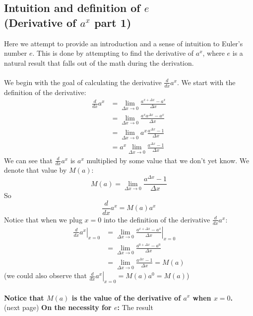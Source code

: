 \documentclass{report}
\begin{document}
\subsection{Intuition and definition of $e$\\(Derivative of $a^x$ part 1)} %
\label{introduction:differentiation:$e$}
Here we attempt to provide an introduction and a sense of intuition to Euler's number $e$. 
This is done by attempting to find the derivative of $a^x$, where $e$ is a natural result
that falls out of the math during the derivation.\\
\vspace{1mm}\\
We begin with the goal of calculating the derivative $\frac{d}{dx}a^x$. We start with the
definition of the derivative:
\begin{align*}
\frac{d}{dx}a^x&=\lim_{\Delta x\to0}\frac{a^{x+\Delta x}-a^x}{\Delta x}\\
&=\lim_{\Delta x\to0}\frac{a^xa^{\Delta x}-a^x}{\Delta x}\\
&=\lim_{\Delta x\to0}a^x\frac{a^{\Delta x}-1}{\Delta x}\\
&=a^x\lim_{\Delta x\to0}\frac{a^{\Delta x}-1}{\Delta x}
\end{align*}
We can see that $\frac{d}{dx}a^x$ is $a^x$ multiplied by some value that we don't yet know. 
We denote that value by $M(a)$:
\begin{equation*}
M(a)=\lim_{\Delta x\to0}\frac{a^{\Delta x}-1}{\Delta x}
\end{equation*}
So
\begin{equation*}
\frac{d}{dx}a^x=M(a)a^x
\end{equation*}
Notice that when we plug $x=0$ into the definition of the derivative $\frac{d}{dx}a^x$:
\begin{align*}
\left.\frac{d}{dx}a^x\right|_{x=0}&=
\lim_{\Delta x\to0}\left.\frac{a^{x+\Delta x}-a^x}{\Delta x}\right|_{x=0}\\
&=\lim_{\Delta x\to0}\frac{a^{0+\Delta x}-a^0}{\Delta x}\\
&=\lim_{\Delta x\to0}\frac{a^{\Delta x}-1}{\Delta x}=M(a)
\end{align*}
(we could also observe that $\left.\frac{d}{dx}a^x\right|_{x=0}=M(a)a^0=M(a)$)\\
\vspace{1mm}\\
\textbf{Notice that $M(a)$ is the value of the derivative of $a^x$ when $x=0$.}\\
(next page)
\newpage
\noindent\textbf{On the necessity for $e$:} The result
\end{document}
